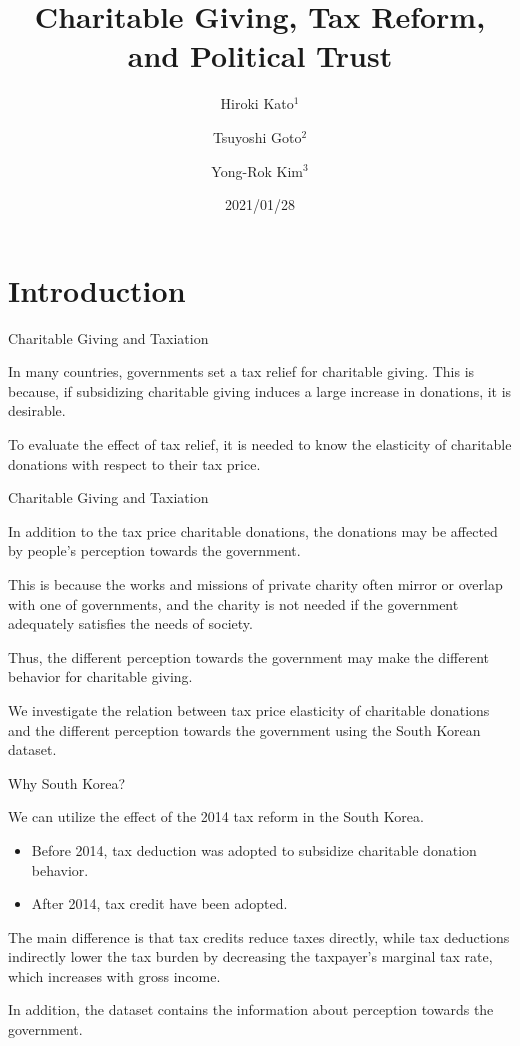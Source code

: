 \documentclass[
  ignorenonframetext,
]{beamer}
\title{Charitable Giving, Tax Reform, and Political Trust}
\author{Hiroki Kato\(^1\) \and Tsuyoshi Goto\(^2\) \and Yong-Rok Kim\(^3\)}
\date{2021/01/28}
\institute{\(^1\)Osaka University \and \(^2\)Chiba University \and \(^3\)Kobe University}
\providecommand{\tightlist}{%
  \setlength{\itemsep}{0pt}\setlength{\parskip}{0pt}}
\begin{document}
\frame{\titlepage}

\hypertarget{introduction}{%
\section{Introduction}\label{introduction}}

\begin{frame}{Charitable Giving and Taxiation}
\protect\hypertarget{charitable-giving-and-taxiation}{}

In many countries, governments set a tax relief for charitable giving.
This is because, if subsidizing charitable giving induces a large
increase in donations, it is desirable.

To evaluate the effect of tax relief, it is needed to know the
elasticity of charitable donations with respect to their tax price.

\end{frame}

\begin{frame}{Charitable Giving and Taxiation}
\protect\hypertarget{charitable-giving-and-taxiation-1}{}

In addition to the tax price charitable donations, the donations may be
affected by people's perception towards the government.

This is because the works and missions of private charity often mirror
or overlap with one of governments, and the charity is not needed if the
government adequately satisfies the needs of society.

Thus, the different perception towards the government may make the
different behavior for charitable giving.

We investigate the relation between tax price elasticity of charitable
donations and the different perception towards the government using the
South Korean dataset.

\end{frame}

\begin{frame}{Why South Korea?}
\protect\hypertarget{why-south-korea}{}

We can utilize the effect of the 2014 tax reform in the South Korea.

\begin{itemize}
\tightlist
\item
  Before 2014, tax deduction was adopted to subsidize charitable
  donation behavior.
\item
  After 2014, tax credit have been adopted.
\end{itemize}

The main difference is that tax credits reduce taxes directly, while tax
deductions indirectly lower the tax burden by decreasing the taxpayer's
marginal tax rate, which increases with gross income.

In addition, the dataset contains the information about perception
towards the government.

\end{frame}
\end{document}
